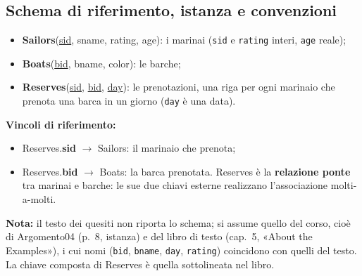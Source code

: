 \documentclass[12pt, a4paper]{article}
\begin{document}
\subsection{Schema di riferimento, istanza e convenzioni}

\begin{tcolorbox}[colback=lightergray!10, colframe=tocsec, title=\textbf{Schema relazionale (chiavi primarie sottolineate)}]
\begin{itemize}
\item \textbf{Sailors}(\underline{sid}, sname, rating, age): i marinai (\texttt{sid} e \texttt{rating} interi, \texttt{age} reale);
\item \textbf{Boats}(\underline{bid}, bname, color): le barche;
\item \textbf{Reserves}(\underline{sid}, \underline{bid}, \underline{day}): le prenotazioni, una riga per ogni marinaio che prenota una barca in un giorno (\texttt{day} è una data).
\end{itemize}
\end{tcolorbox}

\textbf{Vincoli di riferimento:}
\begin{itemize}
\item Reserves.\textbf{sid} $\rightarrow$ Sailors: il marinaio che prenota;
\item Reserves.\textbf{bid} $\rightarrow$ Boats: la barca prenotata. Reserves è la \textbf{relazione ponte} tra marinai e barche: le sue due chiavi esterne realizzano l'associazione molti-a-molti.
\end{itemize}
\textbf{Nota:} il testo dei quesiti non riporta lo schema; si assume quello del corso, cioè di Argomento04 (p.~8, istanza) e del libro di testo (cap.~5, «About the Examples»), i cui nomi (\texttt{bid}, \texttt{bname}, \texttt{day}, \texttt{rating}) coincidono con quelli del testo. La chiave composta di Reserves è quella sottolineata nel libro.
\end{document}
